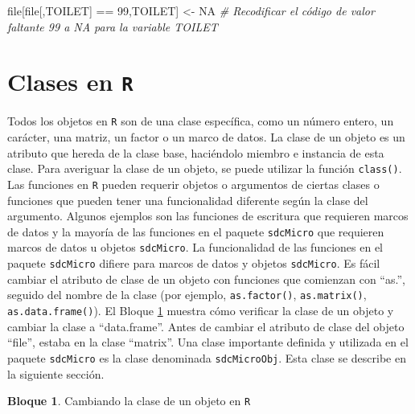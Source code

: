 \documentclass[
]{book}
\newenvironment{Shaded}{\begin{snugshade}}{\end{snugshade}}
\newcommand{\CommentTok}[1]{\textcolor[rgb]{0.56,0.35,0.01}{\textit{#1}}}
\newcommand{\ConstantTok}[1]{\textcolor[rgb]{0.00,0.00,0.00}{#1}}
\newcommand{\DecValTok}[1]{\textcolor[rgb]{0.00,0.00,0.81}{#1}}
\newcommand{\NormalTok}[1]{#1}
\newcommand{\OtherTok}[1]{\textcolor[rgb]{0.56,0.35,0.01}{#1}}
\newcommand{\SpecialCharTok}[1]{\textcolor[rgb]{0.00,0.00,0.00}{#1}}
\newcommand{\StringTok}[1]{\textcolor[rgb]{0.31,0.60,0.02}{#1}}
\theoremstyle{definition}
\theoremstyle{definition}
\newtheorem{example}{Bloque}[chapter]
\theoremstyle{definition}
\theoremstyle{definition}
\theoremstyle{remark}
\begin{document}
\begin{Shaded}
\begin{Highlighting}[]
\NormalTok{file[file[,}\StringTok{\textquotesingle{}TOILET\textquotesingle{}}\NormalTok{] }\SpecialCharTok{==} \DecValTok{99}\NormalTok{,}\StringTok{\textquotesingle{}TOILET\textquotesingle{}}\NormalTok{] }\OtherTok{\textless{}{-}} \ConstantTok{NA}
\CommentTok{\# Recodificar el código de valor faltante 99 a NA para la variable TOILET}
\end{Highlighting}
\end{Shaded}

\hypertarget{clases-en-r}{%
\section{\texorpdfstring{Clases en \texttt{R}}{Clases en R}}\label{clases-en-r}}

Todos los objetos en \texttt{R} son de una clase específica, como un número entero, un carácter, una matriz, un factor o un marco de datos. La clase de un objeto es un atributo que hereda de la clase base, haciéndolo miembro e instancia de esta clase. Para averiguar la clase de un objeto, se puede utilizar la función \texttt{class()}. Las funciones en \texttt{R} pueden requerir objetos o argumentos de ciertas clases o funciones que pueden tener una funcionalidad diferente según la clase del argumento. Algunos ejemplos son las funciones de escritura que requieren marcos de datos y la mayoría de las funciones en el paquete \texttt{sdcMicro} que requieren marcos de datos u objetos \texttt{sdcMicro}. La funcionalidad de las funciones en el paquete \texttt{sdcMicro} difiere para marcos de datos y objetos \texttt{sdcMicro}. Es fácil cambiar el atributo de clase de un objeto con funciones que comienzan con ``as.'', seguido del nombre de la clase (por ejemplo, \texttt{as.factor()}, \texttt{as.matrix()}, \texttt{as.data.frame()}). El Bloque \ref{exm:bloqueMicro7} muestra cómo verificar la clase de un objeto y cambiar la clase a ``data.frame''. Antes de cambiar el atributo de clase del objeto ``file'', estaba en la clase ``matrix''. Una clase importante definida y utilizada en el paquete \texttt{sdcMicro} es la clase denominada \texttt{sdcMicroObj}. Esta clase se describe en la siguiente sección.

\begin{example}
\protect\hypertarget{exm:bloqueMicro7}{}\label{exm:bloqueMicro7}Cambiando la clase de un objeto en \texttt{R}
\end{example}
\end{document}
